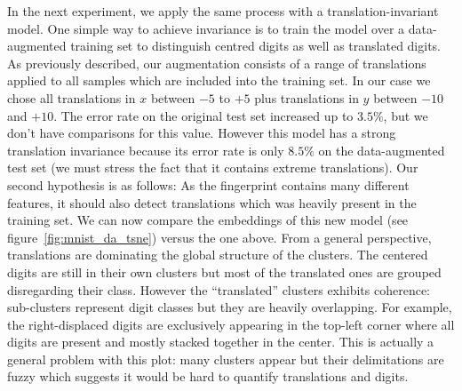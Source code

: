 \documentclass[a4paper,12pt]{report}
\begin{document}
In the next experiment, we apply the same process with a translation-invariant model.
One simple way to achieve invariance is to train the model over a data-augmented training set to distinguish centred digits as well as translated digits.
As previously described, our augmentation consists of a range of translations applied to all samples which are included into the training set.
In our case we chose all translations in $x$ between $-5$ to $+5$ plus translations in $y$ between $-10$ and $+10$.
The error rate on the original test set increased up to $3.5\%$, but we don't have comparisons for this value.
However this model has a strong translation invariance because its error rate is only $8.5\%$ on the data-augmented test set (we must stress the fact that it contains extreme translations).
Our second hypothesis is as follows: As the fingerprint contains many different features, it should also detect translations which was heavily present in the training set.
We can now compare the embeddings of this new model (see figure~\ref{fig:mnist_da_tsne}) versus the one above.
From a general perspective, translations are dominating the global structure of the clusters.
The centered digits are still in their own clusters but most of the translated ones are grouped disregarding their class.
However the ``translated'' clusters exhibits coherence: sub-clusters represent digit classes but they are heavily overlapping.
For example, the right-displaced digits are exclusively appearing in the top-left corner where all digits are present and mostly stacked together in the center.
This is actually a general problem with this plot: many clusters appear but their delimitations are fuzzy which suggests it would be hard to quantify translations and digits.
\end{document}
